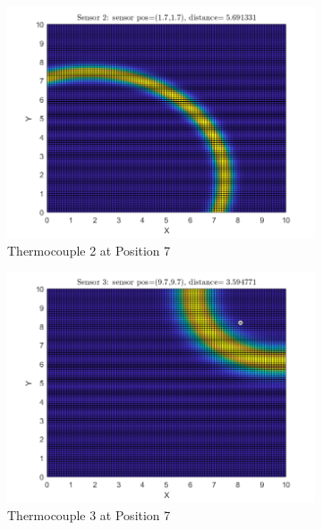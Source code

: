 \documentclass[12pt]{article}
\begin{document}
\begin{figure}[H]
\begin{subfigure}[h]{0.4\textwidth}
        \includegraphics[width=\textwidth]{images/P7S2.png}
        \caption{Thermocouple 2 at Position 7}
        \label{fig:P7S2}
    \end{subfigure}
    \baselineskip
    \begin{subfigure}[h]{0.4\textwidth}
        \includegraphics[width=\textwidth]{images/P7S3.png}
        \caption{Thermocouple 3 at Position 7}
        \label{fig:P7S3}
    \end{subfigure}
    \begin{subfigure}[h]{0.4\textwidth}

\end{subfigure}
\end{figure}
\end{document}
